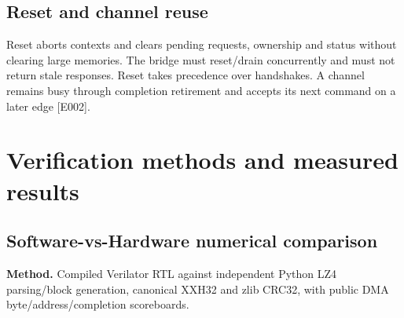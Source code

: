 \documentclass[11pt,a4paper]{article}
\begin{document}
\subsection{Rese\allowbreak{}t and chan\allowbreak{}nel reus\allowbreak{}e}

Rese\allowbreak{}t abor\allowbreak{}ts cont\allowbreak{}exts and clea\allowbreak{}rs pend\allowbreak{}ing requ\allowbreak{}ests,\allowbreak{} owne\allowbreak{}rshi\allowbreak{}p and stat\allowbreak{}us with\allowbreak{}out clea\allowbreak{}ring larg\allowbreak{}e memo\allowbreak{}ries. The brid\allowbreak{}ge must rese\allowbreak{}t/\allowbreak{}drai\allowbreak{}n conc\allowbreak{}urre\allowbreak{}ntly and must not retu\allowbreak{}rn stal\allowbreak{}e resp\allowbreak{}onse\allowbreak{}s. Rese\allowbreak{}t take\allowbreak{}s prec\allowbreak{}eden\allowbreak{}ce over hand\allowbreak{}shak\allowbreak{}es. A chan\allowbreak{}nel rema\allowbreak{}ins busy thro\allowbreak{}ugh comp\allowbreak{}leti\allowbreak{}on reti\allowbreak{}reme\allowbreak{}nt and acce\allowbreak{}pts its next comm\allowbreak{}and on a late\allowbreak{}r edge [\allowbreak{}E002]\allowbreak{}.

\section{Verification methods and measured results}

\subsection{Soft\allowbreak{}ware-vs-Hard\allowbreak{}ware nume\allowbreak{}rica\allowbreak{}l comp\allowbreak{}aris\allowbreak{}on}

\textbf{Method.} Comp\allowbreak{}iled Veri\allowbreak{}lato\allowbreak{}r RTL agai\allowbreak{}nst inde\allowbreak{}pend\allowbreak{}ent Pyth\allowbreak{}on LZ4 pars\allowbreak{}ing/\allowbreak{}bloc\allowbreak{}k gene\allowbreak{}rati\allowbreak{}on,\allowbreak{} cano\allowbreak{}nica\allowbreak{}l XXH3\allowbreak{}2 and zlib CRC3\allowbreak{}2,\allowbreak{} with publ\allowbreak{}ic DMA byte/\allowbreak{}addr\allowbreak{}ess/\allowbreak{}comp\allowbreak{}leti\allowbreak{}on scor\allowbreak{}eboa\allowbreak{}rds.
\end{document}
